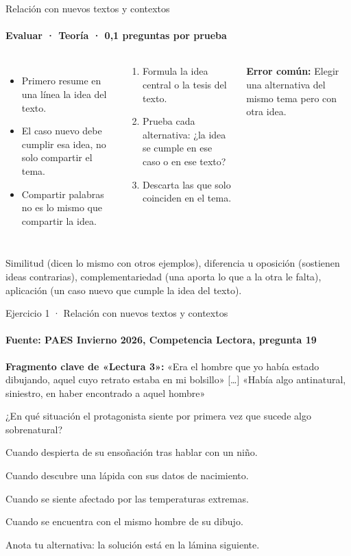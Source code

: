\documentclass[aspectratio=169,11pt]{beamer}
\newcommand{\alternativa}[2]{\begin{opcion}\tecla{#1}\hspace{0.6em}#2\end{opcion}}
\newlength{\ajustealto}
\newenvironment{ajustar}[1][0.74\textheight]
  {\setlength{\ajustealto}{#1}\begin{lrbox}{\ajustecaja}\begin{minipage}{\textwidth}}
  {\end{minipage}\end{lrbox}%
   \ifdim\dimexpr\ht\ajustecaja+\dp\ajustecaja\relax>\ajustealto
     \resizebox*{!}{\ajustealto}{\usebox{\ajustecaja}}\else\usebox{\ajustecaja}\fi}
\begin{document}
\begin{frame}{Relación con nuevos textos y contextos}
\label{tema-cl-contextos}
\framesubtitle{Evaluar · Teoría · 0,1 preguntas por prueba}
\begin{ajustar}
\begin{columns}[T,onlytextwidth]
\begin{itemize}\footnotesize
\item Primero resume en una línea la idea del texto.
\item El caso nuevo debe cumplir esa idea, no solo compartir el tema.
\item Compartir palabras no es lo mismo que compartir la idea.
\end{itemize}
\begin{cajaregla}\scriptsize \begin{enumerate}\item Formula la idea central o la tesis del texto.\item Prueba cada alternativa: ¿la idea se cumple en ese caso o en ese texto?\item Descarta las que solo coinciden en el tema.\end{enumerate}\end{cajaregla}
\begin{notagris}\scriptsize \textbf{Error común:} Elegir una alternativa del mismo tema pero con otra idea.\end{notagris}
\end{columns}
\begin{cajaclave}\footnotesize
Similitud (dicen lo mismo con otros ejemplos), diferencia u oposición (sostienen ideas contrarias), complementariedad (una aporta lo que a la otra le falta), aplicación (un caso nuevo que cumple la idea del texto).
\end{cajaclave}
\end{ajustar}
\end{frame}

\begin{frame}{Ejercicio 1 · Relación con nuevos textos y contextos}
\framesubtitle{Fuente: PAES Invierno 2026, Competencia Lectora, pregunta 19}
\begin{ajustar}[0.7\textheight]
\begin{notagris}\scriptsize \textbf{Fragmento clave de «Lectura 3»:} «Era el hombre que yo había estado dibujando, aquel cuyo retrato estaba en mi bolsillo» [\ldots] «Había algo antinatural, siniestro, en haber encontrado a aquel hombre»\end{notagris}
{\small ¿En qué situación el protagonista siente por primera vez que sucede algo sobrenatural?}
\vspace{0.4em}
\alternativa{A}{Cuando despierta de su ensoñación tras hablar con un niño.}
\alternativa{B}{Cuando descubre una lápida con sus datos de nacimiento.}
\alternativa{C}{Cuando se siente afectado por las temperaturas extremas.}
\alternativa{D}{Cuando se encuentra con el mismo hombre de su dibujo.}
\end{ajustar}
\vfill{\tiny\color{zinc500}\hfill Anota tu alternativa: la solución está en la lámina siguiente.}
\end{frame}
\end{document}
